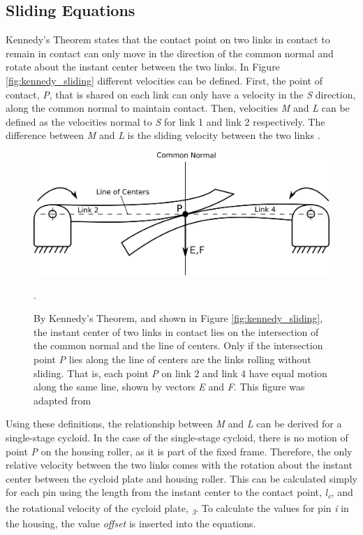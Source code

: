 \subsection{Sliding Equations} \label{ch:design:pin_roll_1s:sliding_equations}

Kennedy's Theorem states that the contact point on two links in contact to remain in contact can only move in the direction of the common normal and rotate about the instant center between the two links. In Figure \ref{fig:kennedy_sliding} different velocities can be defined. First, the point of contact, \textit{P}, that is shared on each link can only have a velocity in the \textit{S} direction, along the common normal to maintain contact. Then, velocities \textit{M} and \textit{L} can be defined as the velocities normal to \textit{S} for link 1 and link 2 respectively. The difference between \textit{M} and \textit{L} is the sliding velocity between the two links \cite{ref:kinematics_and_dynamics}.

\begin{figure}[!b]
   \centering
   \includegraphics[width=0.8\linewidth]{fig/kennedy_rolling}
   \caption{By Kennedy's Theorem, and shown in Figure \ref{fig:kennedy_sliding}, the instant center of two links in contact lies on the intersection of the common normal and the line of centers. Only if the intersection point \textit{P} lies along the line of centers are the links rolling without sliding. That is, each point \textit{P} on link 2 and link 4 have equal motion along the same line, shown by vectors \textit{E} and \textit{F}.
   This figure was adapted from \cite{ref:kinematics_and_dynamics}}
   \label{fig:kennedy_rolling}.
\end{figure}

Using these definitions, the relationship between \textit{M} and \textit{L} can be derived for a single-stage cycloid. In the case of the single-stage cycloid, there is no motion of point \textit{P} on the housing roller, as it is part of the fixed frame. Therefore, the only relative velocity between the two links comes with the rotation about the instant center between the cycloid plate and housing roller. This can be calculated simply for each pin using the length from the instant center to the contact point, \textit{l\textsubscript{c}}, and the rotational velocity of the cycloid plate, \textit{\textomega\textsubscript{3}}. To calculate the values for pin \textit{i} in the housing, the value \textit{offset} is inserted into the equations.  

